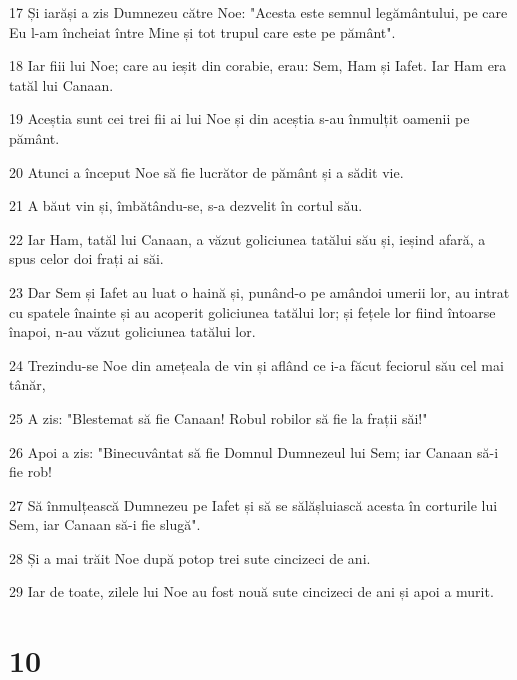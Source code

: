 \par 17 Și iarăși a zis Dumnezeu către Noe: "Acesta este semnul legământului, pe care Eu l-am încheiat între Mine și tot trupul care este pe pământ".
\par 18 Iar fiii lui Noe; care au ieșit din corabie, erau: Sem, Ham și Iafet. Iar Ham era tatăl lui Canaan.
\par 19 Aceștia sunt cei trei fii ai lui Noe și din aceștia s-au înmulțit oamenii pe pământ.
\par 20 Atunci a început Noe să fie lucrător de pământ și a sădit vie.
\par 21 A băut vin și, îmbătându-se, s-a dezvelit în cortul său.
\par 22 Iar Ham, tatăl lui Canaan, a văzut goliciunea tatălui său și, ieșind afară, a spus celor doi frați ai săi.
\par 23 Dar Sem și Iafet au luat o haină și, punând-o pe amândoi umerii lor, au intrat cu spatele înainte și au acoperit goliciunea tatălui lor; și fețele lor fiind întoarse înapoi, n-au văzut goliciunea tatălui lor.
\par 24 Trezindu-se Noe din amețeala de vin și aflând ce i-a făcut feciorul său cel mai tânăr,
\par 25 A zis: "Blestemat să fie Canaan! Robul robilor să fie la frații săi!"
\par 26 Apoi a zis: "Binecuvântat să fie Domnul Dumnezeul lui Sem; iar Canaan să-i fie rob!
\par 27 Să înmulțească Dumnezeu pe Iafet și să se sălășluiască acesta în corturile lui Sem, iar Canaan să-i fie slugă".
\par 28 Și a mai trăit Noe după potop trei sute cincizeci de ani.
\par 29 Iar de toate, zilele lui Noe au fost nouă sute cincizeci de ani și apoi a murit.

\chapter{10}

